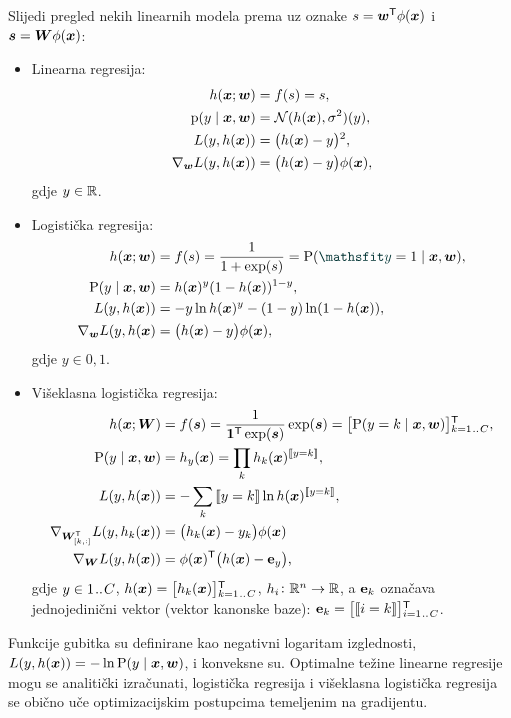 \documentclass[utf8, diplomski, lmodern]{fer}
\begin{document}
Slijedi pregled nekih linearnih modela prema \citet{Snajder:2017:SULR2} uz oznake $s=\vec w^\tp\phi(\vec x)$ i $\vec s=\mat W\phi(\vec x)$:
\begin{itemize}
\item Linearna regresija:
\begin{align*}
h(\vec x;\vec w) &= f(s) = s, \\
\p(y\mid\vec x,\vec w) &= \mathcal{N}(h(\vec x),\sigma^2)(y), \\
L(y, h(\vec x)) &= \del{h(\vec x)-y}^2, \\
\nabla_{\vec w}L(y, h(\vec x)) &= \del{h(\vec x)-y}\phi(\vec x),
\end{align*}
gdje $y\in\mathbb{R}$.
\item Logistička regresija:
\begin{align*}
h(\vec x;\vec w) &= f(s) 
= \frac{1}{1+\exp\del{s}} = \P(\rvar y=1\mid\vec x,\vec w), \\
\P(y\mid\vec x,\vec w) &= h(\vec x)^y(1-h(\vec x))^{1-y}, \\
L(y, h(\vec x)) &= -y\ln h(\vec x)^y-(1-y)\ln(1-h(\vec x)), \\
\nabla_{\vec w}L(y, h(\vec x) &= \del{h(\vec x)-y}\phi(\vec x),
\end{align*}
gdje $y\in{0,1}$. 
\item Višeklasna logistička regresija:
\begin{align*}
h(\vec x;\mat W) &= f(\vec s) 
= \frac{1}{\cvec 1^\tp\exp(\vec s)}\exp(\vec s) = \sbr{\P(y=k\mid\vec x,\vec w)}_{k=1\bidot C}^\tp, \\
\P(y\mid\vec x,\vec w) &= h_y(\vec x) = \prod_k h_k(\vec x)^\enbbracket{y=k}, \\
L(y, h(\vec x)) &= -\sum_k \enbbracket{y=k}\ln h(\vec x)^\enbbracket{y=k}, \\
\nabla_{\mat W_{[k,:]}^\tp}L(y, h_k(\vec x)) &= \del{h_k(\vec x)-y_k}\phi(\vec x) \\
\nabla_{\mat W}L(y, h(\vec x)) &= \phi(\vec x)^\tp \del{h(\vec x)-\cvec e_y} \text{,}
\end{align*}
gdje $y\in{1\mkern1.5mu{..}\mkern1.5muC}$, $h(\vec x)=\sbr{h_k(\vec x)}_{k=1\bidot C}^\tp$, $h_i \colon \mathbb{R}^n \to \mathbb{R}$, a $\mathbf{e}_k$ označava jednojedinični vektor (vektor kanonske baze): $\cvec e_k=\sbr{\enbbracket{i=k}}_{i=1\bidot C}^\tp$.
\end{itemize}
Funkcije gubitka su definirane kao negativni logaritam izglednosti, $L(y, h(\vec x))=-\ln\P(y\mid\vec x,\vec w)$, i konveksne su. Optimalne težine linearne regresije mogu se analitički izračunati, logistička regresija i višeklasna logistička regresija se obično uče optimizacijskim postupcima temeljenim na gradijentu.
\end{document}
